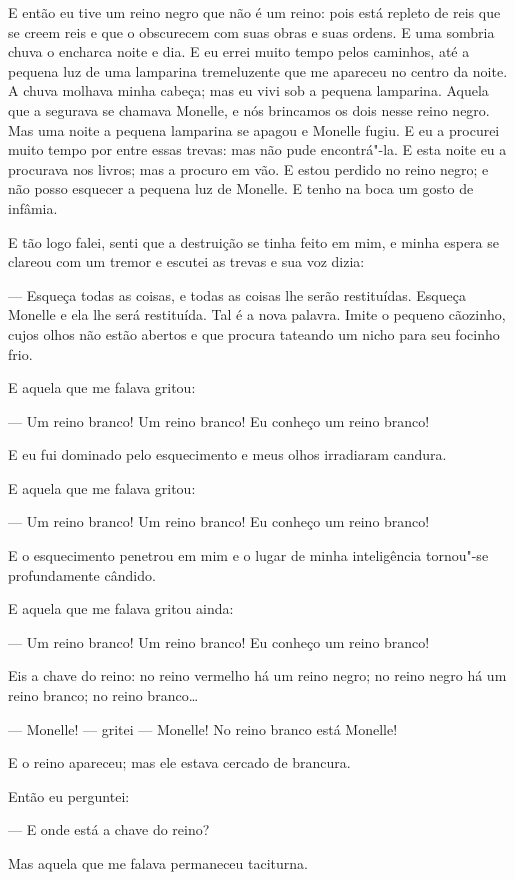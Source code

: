 E então eu tive um reino negro que não é um reino: pois está repleto de
reis que se creem reis e que o obscurecem com suas obras e suas ordens. E
uma sombria chuva o encharca noite e dia. E eu errei muito tempo pelos
caminhos, até a pequena luz de uma lamparina tremeluzente que me apareceu no
centro da noite. A chuva molhava minha cabeça; mas eu vivi sob a pequena
lamparina. Aquela que a segurava se chamava Monelle, e nós brincamos os dois
nesse reino negro. Mas uma noite a pequena lamparina se apagou e Monelle
fugiu. E eu a procurei muito tempo por entre essas trevas: mas não pude
encontrá"-la. E esta noite eu a procurava nos livros; mas a procuro em vão.
E estou perdido no reino negro; e não posso esquecer a pequena luz de
Monelle. E tenho na boca um gosto de infâmia.

E tão logo falei, senti que a destruição se tinha feito em mim, e minha
espera se clareou com um tremor e escutei as trevas e sua voz dizia:

--- Esqueça todas as coisas, e todas as coisas lhe serão restituídas.
Esqueça Monelle e ela lhe será restituída. Tal é a nova palavra. Imite o
pequeno cãozinho, cujos olhos não estão abertos e que procura tateando um
nicho para seu focinho frio.

E aquela que me falava gritou:

--- Um reino branco! Um reino branco! Eu conheço um reino branco!

E eu fui dominado pelo esquecimento e meus olhos irradiaram candura.

E aquela que me falava gritou:

--- Um reino branco! Um reino branco! Eu conheço um reino branco!

E o esquecimento penetrou em mim e o lugar de minha inteligência
tornou"-se profundamente cândido.

E aquela que me falava gritou ainda:

--- Um reino branco! Um reino branco! Eu conheço um reino branco!

Eis a chave do reino: no reino vermelho há um reino negro; no reino
negro há um reino branco; no reino branco\ldots{}

--- Monelle! --- gritei --- Monelle! No reino branco está Monelle!

E o reino apareceu; mas ele estava cercado de \mbox{brancura.}

Então eu perguntei:

--- E onde está a chave do reino?

Mas aquela que me falava permaneceu taciturna.

